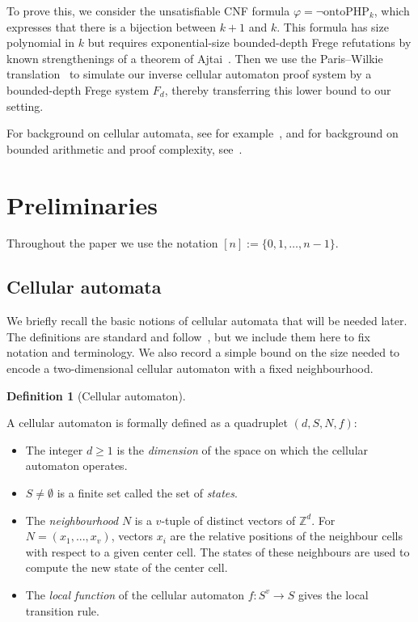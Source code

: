 \documentclass{article}
\theoremstyle{plain}
\theoremstyle{definition}
\newtheorem{definition}[theorem]{Definition}
\begin{document}
To prove this, we consider the unsatisfiable CNF formula 
\(
\varphi = \lnot \mathrm{ontoPHP}_k
\), which expresses that there is a bijection between $k+1$ and $k$. This formula has size polynomial in $k$ but requires
exponential-size bounded-depth Frege refutations by known strengthenings of a theorem of Ajtai~\cite{Ajtai1988}. Then we use the Paris--Wilkie translation~\cite{ParisWilkie1985} to simulate our inverse cellular automaton proof system by a bounded-depth Frege system $F_d$, thereby transferring this lower bound to our setting.

For background on cellular automata, see for example~\cite{kari}, and for background on bounded arithmetic and proof complexity, see~\cite{krajicek2019}.


\section{Preliminaries}

Throughout the paper we use the notation $[n] := \{0,1,\dots,n-1\}$.


\subsection{Cellular automata}\label{subsec:cellular_automata}

We briefly recall the basic notions of cellular automata that will be needed later.
The definitions are standard and follow~\cite{DURAND1994387}, but we include them here
to fix notation and terminology. We also record a simple bound on the size
needed to encode a two-dimensional cellular automaton with a fixed neighbourhood.

\begin{definition}[Cellular automaton]~\label{def:CA}

A cellular automaton is formally defined as a quadruplet
$(d, S, N, f)$:
\begin{itemize}
    \item The integer $d \geq 1$ is the \emph{dimension} of the space on which the cellular automaton operates.
    \item $S \not = \emptyset$ is a finite set called the set of \emph{states}.
    \item The \emph{neighbourhood} $N$ is a $v$-tuple of distinct vectors of $\mathbb{Z}^d$. For $N = (x_1, . . ., x_v)$, vectors $x_i$ are the relative positions of the neighbour cells with respect to a given center cell. The states of these neighbours are used to compute the new state of the center cell.
    \item The \emph{local function} of the cellular automaton $f:
S^v \to S$ gives the local transition rule.
\end{itemize}
\end{definition}
\end{document}
